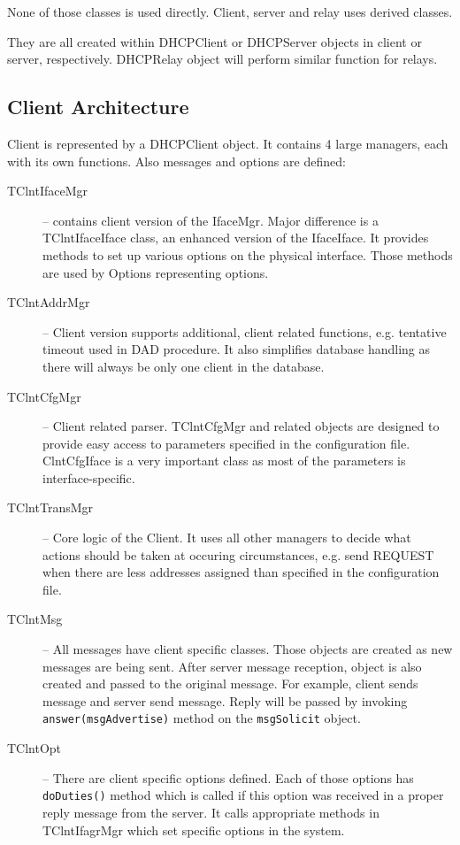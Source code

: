 None of those classes is used directly. Client, server and
relay uses derived classes.

They are all created within DHCPClient or DHCPServer objects in client
or server, respectively. DHCPRelay object will perform similar
function for relays.

\subsection{Client Architecture}

Client is represented by a DHCPClient object. It contains 4 large
managers, each with its own functions. Also messages and options are
defined:

\begin{description}
\item[TClntIfaceMgr] -- contains client version of the IfaceMgr. Major
  difference is a TClntIfaceIface class, an enhanced version of the
  IfaceIface. It provides methods to set up various options on the
  physical interface. Those methods are used by Options representing
  options.
\item[TClntAddrMgr] -- Client version supports additional, client
  related functions, e.g. tentative timeout used in DAD procedure. It
  also simplifies database handling as there will always be only one
  client in the database.
\item[TClntCfgMgr] -- Client related parser. TClntCfgMgr and related
  objects are designed to provide easy access to parameters specified
  in the configuration file. ClntCfgIface is a very important class as
  most of the parameters is interface-specific.
\item[TClntTransMgr] -- Core logic of the Client. It uses all other
  managers to decide what actions should be taken at occuring
  circumstances, e.g. send REQUEST when there are less addresses
  assigned than specified in the configuration file.
\item[TClntMsg] -- All messages have client specific
  classes. Those objects are created as new messages are being
  sent. After server message reception, object is also created and
  passed to the original message. For example, client sends
   message and server send  message. Reply
  will be passed by invoking \verb+answer(msgAdvertise)+ method on the
  \verb+msgSolicit+ object.
\item[TClntOpt] -- There are client specific options defined. Each
  of those options has \verb+doDuties()+ method which is called if this
  option was received in a proper reply message from the server. It
  calls appropriate methods in TClntIfagrMgr which set specific options
  in the system.
\end{description}


